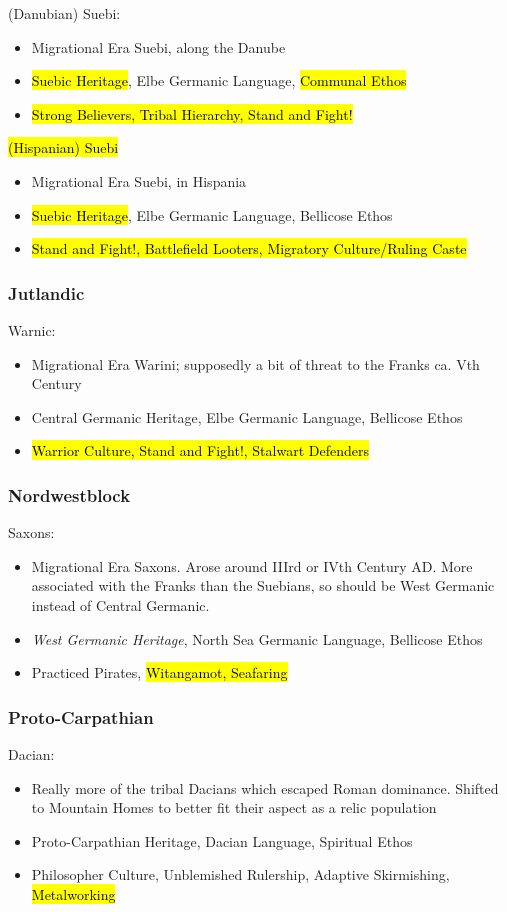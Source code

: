 \documentclass{article}
\begin{document}
	(Danubian) Suebi:
	\begin{itemize}
		\item Migrational Era Suebi, along the Danube
		\item \hl{Suebic Heritage}, Elbe Germanic Language, \hl{Communal Ethos}
		\item \hl{Strong Believers, Tribal Hierarchy, Stand and Fight!}
	\end{itemize}
	
	\hl{(Hispanian) Suebi}
	\begin{itemize}
		\item Migrational Era Suebi, in Hispania
		\item \hl{Suebic Heritage}, Elbe Germanic Language, Bellicose Ethos
		\item \hl{Stand and Fight!, Battlefield Looters, Migratory Culture/Ruling Caste}
	\end{itemize}
	
	\subsubsection{Jutlandic}
	Warnic:
	\begin{itemize}
		\item Migrational Era Warini; supposedly a bit of threat to the Franks ca. Vth Century
		\item Central Germanic Heritage, Elbe Germanic Language, Bellicose Ethos
		\item \hl{Warrior Culture, Stand and Fight!, Stalwart Defenders}
	\end{itemize}
	
	\subsubsection{Nordwestblock}
	Saxons:
	\begin{itemize}
		\item Migrational Era Saxons.
		Arose around IIIrd or IVth Century AD.
		More associated with the Franks than the Suebians, so should be West Germanic instead of Central Germanic.
		\item \textit{West Germanic Heritage}, North Sea Germanic Language, Bellicose Ethos
		\item Practiced Pirates, \hl{Witangamot, Seafaring}
	\end{itemize}
	
	\subsubsection{Proto-Carpathian}
	Dacian:
	\begin{itemize}
		\item Really more of the tribal Dacians which escaped Roman dominance.
		Shifted to Mountain Homes to better fit their aspect as a relic population
		\item Proto-Carpathian Heritage, Dacian Language, Spiritual Ethos
		\item Philosopher Culture, Unblemished Rulership, Adaptive Skirmishing, \hl{Metalworking}
	\end{itemize}
	
\end{document}

